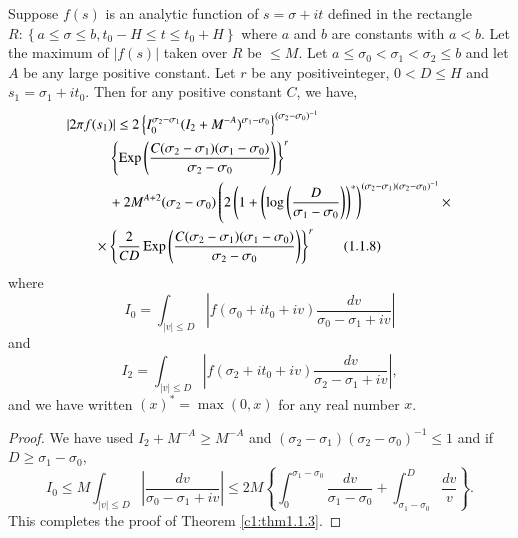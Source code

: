 \begin{theorem}\label{c1:thm1.1.3}
Suppose $f(s)$ is an analytic function of $s = \sigma + it$ defined in the rectangle $R : \left\{ a \leq  \sigma \leq b, t_0 - H \leq t \leq t_0 + H\right\}$ where $a$ and $b$ are constants with $a<b$. Let the maximum of $|f(s)|$ taken over $R$ be $\leq M$. Let $a \leq \sigma_0 < \sigma_1 < \sigma_2 \leq b$ and let $A$ be any large positive constant. Let $r$ be any positive\pageoriginale integer, $0 < D \leq H$ and $s_1 = \sigma_1 + it_0$. Then for any positive constant $C$, we have,
\begin{align*}
& |2 \pi f(s_1)| \leq 2 \left\{I_0^{\sigma_2 - \sigma_1} (I_2 +
  M^{-A})^{\sigma_1 - \sigma_0} \right\}^{(\sigma_2 -
    \sigma_0)^{-1}}\\  
&\qquad\quad\left\{ \operatorname{Exp} \left(\frac{C(\sigma_2 - \sigma_1) (\sigma_1 - \sigma_0)}{\sigma_2 - \sigma_0} \right)\right\}^r\\
&\qquad\quad {} + 2 M^{A+2} (\sigma_2 - \sigma_0) \left(2  \left(1+
  \left(\log \left( \frac{D}{\sigma_1 - \sigma_0}\right) \right)^*
  \right)^{(\sigma_2 - \sigma_1) (\sigma_2 - \sigma_0)^{-1}} \times
  \right.\\ 
&\qquad \times  \left\{\frac{2}{CD} \operatorname{Exp} \left( \frac{C(\sigma_2 - \sigma_1) (\sigma_1 - \sigma_0)}{\sigma_2-\sigma_0}\right) \right\}^r\tag{1.1.8}\label{c1:eq1.1.8}
\end{align*}
where 
\begin{equation*}
I_0 = \int_{|v| \leq D} \left| f(\sigma_0 + it_0 + iv) \frac{dv}{\sigma_0 - \sigma_1 + iv}\right| \tag{1.1.9}\label{c1:eq1.1.9}
\end{equation*}
and 
\begin{equation*}
I_2 = \int_{|v| \leq D} \left| f(\sigma_2 + it_0 + iv) \frac{dv}{\sigma_2 - \sigma_1 + iv}\right|, \tag{1.1.10}\label{c1:eq1.1.10}
\end{equation*}
and we have written $(x)^* = \max (0,x)$ for any real number $x$. 
\end{theorem}

\begin{proof}
We have used $I_2 + M^{-A} \geq M^{-A}$ and $(\sigma_2 - \sigma_1) (\sigma_2 - \sigma_0)^{-1} \leq 1$ and if $D \geq \sigma_1 - \sigma_0$,
$$
I_0 \leq M \int_{|v| \leq D} \left| \frac{dv}{\sigma_0 - \sigma_1 + iv}\right| \leq 2 M \left\{\int^{\sigma_1 - \sigma_0}_{0} \frac{dv}{\sigma_1 - \sigma_0} + \int^{D}_{\sigma_1 - \sigma_0} \frac{dv}{v} \right\}.
$$
This completes the proof of Theorem  \ref{c1:thm1.1.3}.
\end{proof}

